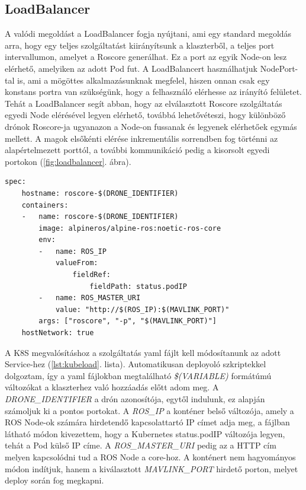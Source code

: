 \subsection{LoadBalancer}
A valódi megoldást a LoadBalancer fogja nyújtani, ami egy standard megoldás arra, hogy egy teljes szolgáltatást kiirányítsunk a klaszterből, a teljes port intervallumon, amelyet a Roscore generálhat. Ez a port az egyik Node-on lesz elérhető, amelyiken az adott Pod fut. A LoadBalancert használhatjuk NodePort-tal is, ami a mögöttes alkalmazásunknak megfelel, hiszen onnan csak egy konstans portra van szükségünk, hogy a felhasználó elérhesse az irányító felületet. Tehát a LoadBalancer segít abban, hogy az elválasztott Roscore szolgáltatás egyedi Node elérésével legyen elérhető, továbbá lehetővéteszi, hogy különböző drónok Roscore-ja ugyanazon a Node-on fussanak és legyenek elérhetőek egymás mellett. A magok elsőkénti elérése inkrementális sorrendben fog történni az alapértelmezett porttól, a további kommunikáció pedig a kisorsolt egyedi portokon (\ref{fig:loadbalancer}. ábra). \\

\begin{minipage}{\linewidth}
\begin{lstlisting}[caption={Roscore Service specifikációja inkrementális változókkal}, label={lst:kubeload}]
spec:
	hostname: roscore-$(DRONE_IDENTIFIER)
	containers:
	-	name: roscore-$(DRONE_IDENTIFIER)
		image: alpineros/alpine-ros:noetic-ros-core 
		env:
		-	name: ROS_IP
			valueFrom:
				fieldRef:
					fieldPath: status.podIP
		-	name: ROS_MASTER_URI
			value: "http://$(ROS_IP):$(MAVLINK_PORT)"
		args: ["roscore", "-p", "$(MAVLINK_PORT)"]
	hostNetwork: true
\end{lstlisting}
\end{minipage}

\noindent
A K8S megvalósításhoz a szolgáltatás yaml fájlt kell módosítanunk az adott Service-hez (\ref{lst:kubeload}. lista). Automatikusan deployoló szkriptekkel dolgoztam, így a yaml fájlokban megtalálható \emph{\$(VARIABLE)} formátúmú változókat a klaszterhez való hozzáadás előtt adom meg. A \emph{DRONE\_IDENTIFIER} a drón azonosítója, egytől indulunk, ez alapján számoljuk ki a pontos portokat. A \emph{ROS\_IP} a konténer belső változója, amely a ROS Node-ok számára hirdetendő kapcsolattartó IP címet adja meg, a fájlban látható módon kivezettem, hogy a Kubernetes status.podIP változója legyen, tehát a Pod külső IP címe. A \emph{ROS\_MASTER\_URI} pedig az a HTTP cím melyen kapcsolódni tud a ROS Node a core-hoz. A konténert nem hagyományos módon indítjuk, hanem a kiválasztott \emph{MAVLINK\_PORT} hirdető porton, melyet deploy során fog megkapni. \\

